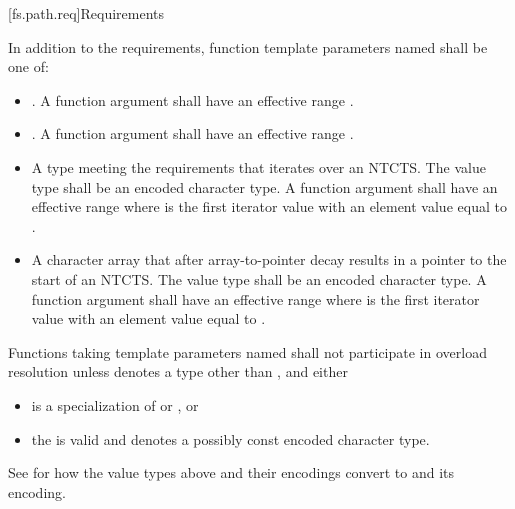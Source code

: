 [fs.path.req]{Requirements}

\pnum
In addition to the requirements,
function template parameters named 
shall be one of:
\begin{itemize}
\item {}. A function
  argument   shall have an
  effective range .
\item {}. A function
  argument   shall have an
  effective range .
\item A type meeting the  requirements that iterates over an NTCTS\@.
  The value type shall be an encoded character type. A function argument
    shall have an effective range
   where  is the first
  iterator value with an element value equal to
  .
\item A character array that after array-to-pointer decay results in a
  pointer to the start of an NTCTS\@. The value type shall be an encoded character type. A
  function argument   shall
  have an effective range  where
   is the first iterator value with an element value equal to
  .
\end{itemize}

\pnum
Functions taking template parameters named 
shall not participate in overload resolution unless
 denotes a type other than , and
either
\begin{itemize}
\item
{} is a specialization of
 or , or
\item
the   is valid and
denotes a possibly const encoded character type.
\end{itemize}

\pnum
\begin{note}
See 
for how the value types above and their encodings convert to
 and its encoding.
\end{note}

